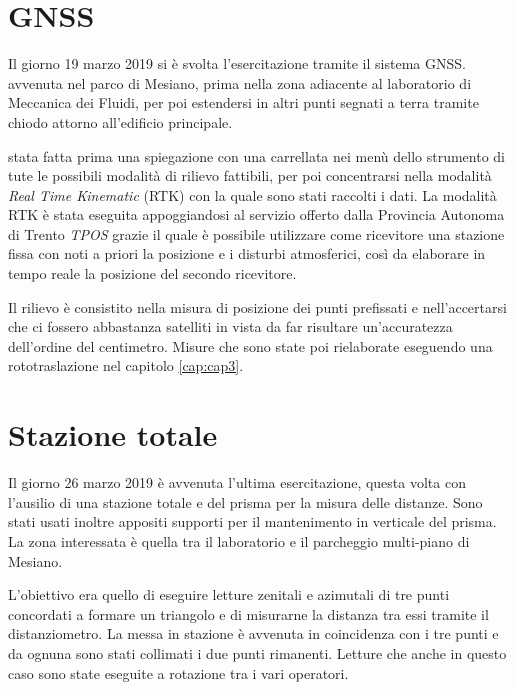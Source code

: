 \section{GNSS}
Il giorno 19 marzo 2019 si è svolta l'esercitazione tramite il sistema GNSS. \e avvenuta nel parco di Mesiano, prima nella zona adiacente al laboratorio di Meccanica dei Fluidi, per poi estendersi in altri punti segnati a terra tramite chiodo attorno all'edificio principale.

\e stata fatta prima una spiegazione con una carrellata nei menù dello strumento di tute le possibili modalità di rilievo fattibili, per poi concentrarsi nella modalità \emph{Real Time Kinematic} (RTK) con la quale sono stati raccolti i dati.
La modalità RTK è stata eseguita appoggiandosi al servizio offerto dalla Provincia Autonoma di Trento \emph{TPOS} grazie il quale è possibile utilizzare come ricevitore una stazione fissa con noti a priori la posizione e i disturbi atmosferici, così da elaborare in tempo reale la posizione del secondo ricevitore.

Il rilievo è consistito nella misura di posizione dei punti prefissati e nell'accertarsi che ci fossero abbastanza satelliti in vista da far risultare un'accuratezza dell'ordine del centimetro. 
Misure che sono state poi rielaborate eseguendo una rototraslazione nel capitolo \ref{cap:cap3}.
\section{Stazione totale}
Il giorno 26 marzo 2019 è avvenuta l'ultima esercitazione, questa volta con l'ausilio di una stazione totale e del prisma per la misura delle distanze. 
Sono stati usati inoltre appositi supporti per il mantenimento in verticale del prisma.
La zona interessata è quella tra il laboratorio e il parcheggio multi-piano di Mesiano. 

L'obiettivo era quello di eseguire letture zenitali e azimutali di tre punti concordati a formare un triangolo e di misurarne la distanza tra essi tramite il distanziometro. 
La messa in stazione è avvenuta in coincidenza con i tre punti e da ognuna sono stati collimati i due punti rimanenti. 
Letture che anche in questo caso sono state eseguite a rotazione tra i vari operatori.